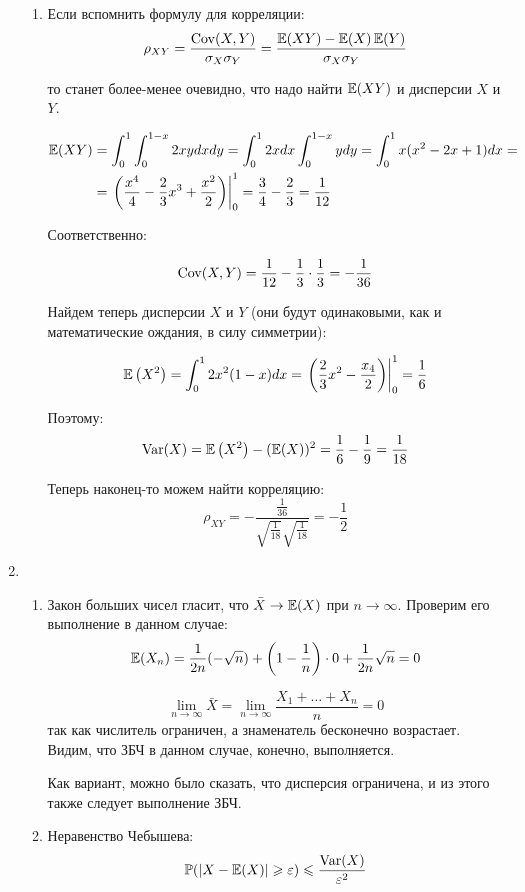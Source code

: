 \begin{enumerate}
\begin{enumerate}
\item Если вспомнить формулу для корреляции:
\[
\rho_{XY} = \frac{\operatorname{Cov}(X, Y)}{\sigma_X\sigma_Y}  = \frac{\operatorname{\mathbb{E}}(XY) - \operatorname{\mathbb{E}}(X)\operatorname{\mathbb{E}}(Y)}{\sigma_X\sigma_Y}
\]

то станет более-менее очевидно, что надо найти $\operatorname{\mathbb{E}}(XY)$ и дисперсии $X$ и $Y$.

\begin{align*}
\operatorname{\mathbb{E}}(XY) &= \int _{0}^{1} \int _{0}^{1-x} 2xy dxdy = \int _{0}^{1} 2xdx \int _{0}^{1-x}ydy =  \int _{0}^{1}x(x^2-2x+1)dx = \\
&= \left. \left(\frac{x^4}{4} - \frac{2}{3}x^3 + \frac{x^2}{2}\right) \right|^{1}_{0} = \frac{3}{4}-\frac{2}{3} = \frac{1}{12}
\end{align*}

Соответственно:

\[
\operatorname{Cov}(X, Y) = \frac{1}{12} - \frac{1}{3}\cdot \frac{1}{3} = -\frac{1}{36}
\]

Найдем теперь дисперсии $X$ и $Y$ (они будут одинаковыми, как и математические ождания, в силу симметрии):

\[
\operatorname{\mathbb{E}}\left(X^2\right) = \int _{0}^{1} 2x^2(1-x)dx = \left. \left( \frac{2}{3}x^2 - \frac{x_4}{2} \right) \right|_{0}^{1} = \frac{1}{6}
\]

Поэтому:
\[
\operatorname{Var}(X) = \operatorname{\mathbb{E}}\left(X^2\right) - (\operatorname{\mathbb{E}}(X))^2 = \frac{1}{6} - \frac{1}{9} = \frac{1}{18}
\]

Теперь наконец-то можем найти корреляцию:
\[
\rho_{XY} = -\frac{\frac{1}{36}}{\sqrt{\frac{1}{18}}\sqrt{\frac{1}{18}}} = -\frac{1}{2}
\]
\end{enumerate}

\item

\begin{enumerate}

\item Закон больших чисел гласит, что $\bar{X} \rightarrow
\operatorname{\mathbb{E}}(X)$ при $n\rightarrow \infty$. Проверим его выполнение в данном случае:
\[
\operatorname{\mathbb{E}}(X_n) = \frac{1}{2n}(-\sqrt{n}) + \left(1-\frac{1}{n}\right)\cdot0 + \frac{1}{2n}\sqrt{n} = 0
\]

\[
\lim_{n\rightarrow\infty} \bar{X} = \lim_{n\rightarrow\infty} \frac{X_1 +\dots + X_n}{n} = 0
\]
так как числитель ограничен, а знаменатель бесконечно возрастает.
Видим, что ЗБЧ в данном случае, конечно, выполняется.

Как вариант, можно было сказать, что дисперсия ограничена, и из этого также следует выполнение ЗБЧ.
\item Неравенство Чебышева:
\[
\operatorname{\mathbb{P}}(|X-\operatorname{\mathbb{E}}(X)|\geqslant \varepsilon) \leqslant \frac{\operatorname{Var}(X)}{\varepsilon^2}
\]


\end{enumerate}
\end{enumerate}

